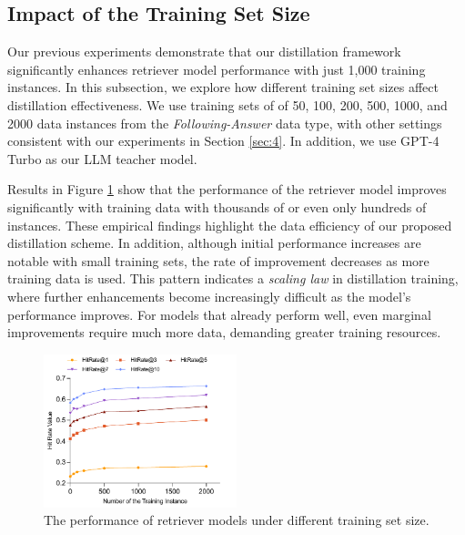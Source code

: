 \subsection{Impact of the Training Set Size} 
\label{sec:5-3}
Our previous experiments demonstrate that our distillation framework significantly enhances retriever model performance with just 1,000 training instances. 
In this subsection, we explore how different training set sizes affect distillation effectiveness.
We use training sets of of 50, 100, 200, 500, 1000, and 2000 data instances from the \textit{Following-Answer} data type, with other settings consistent with our experiments in Section \ref{sec:4}. 
In addition, we use GPT-4 Turbo as our LLM teacher model.

Results in Figure \ref{fig:05} show that the performance of the retriever model improves significantly with training data with thousands of or even only hundreds of instances.
These empirical findings highlight the data efficiency of our proposed distillation scheme.
In addition, although initial performance increases are notable with small training sets, the rate of improvement decreases as more training data is used.
This pattern indicates a \textit{scaling law} in distillation training, where further enhancements become increasingly difficult as the model's performance improves.
For models that already perform well, even marginal improvements require much more data, demanding greater training resources.
\begin{figure}
    \centering
    \includegraphics[width=0.5\textwidth]{latex/pic/fig5.pdf}
    \caption{The performance of retriever models under different training set size.}
    \label{fig:05}
    \vspace{-4mm}
\end{figure}

